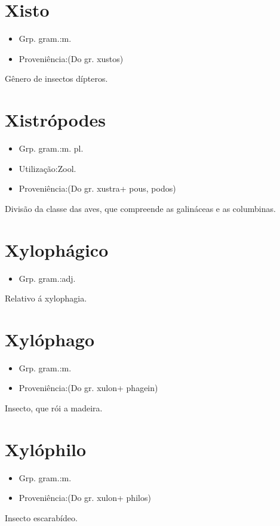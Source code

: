 \section{Xisto}
\begin{itemize}
\item {Grp. gram.:m.}
\end{itemize}
\begin{itemize}
\item {Proveniência:(Do gr. \textunderscore xustos\textunderscore )}
\end{itemize}
Gênero de insectos dípteros.
\section{Xistrópodes}
\begin{itemize}
\item {Grp. gram.:m. pl.}
\end{itemize}
\begin{itemize}
\item {Utilização:Zool.}
\end{itemize}
\begin{itemize}
\item {Proveniência:(Do gr. \textunderscore xustra\textunderscore  + \textunderscore pous\textunderscore , \textunderscore podos\textunderscore )}
\end{itemize}
Divisão da classe das aves, que compreende as galináceas e as columbinas.
\section{Xylophágico}
\begin{itemize}
\item {Grp. gram.:adj.}
\end{itemize}
Relativo á xylophagia.
\section{Xylóphago}
\begin{itemize}
\item {Grp. gram.:m.}
\end{itemize}
\begin{itemize}
\item {Proveniência:(Do gr. \textunderscore xulon\textunderscore  + \textunderscore phagein\textunderscore )}
\end{itemize}
Insecto, que rói a madeira.
\section{Xylóphilo}
\begin{itemize}
\item {Grp. gram.:m.}
\end{itemize}
\begin{itemize}
\item {Proveniência:(Do gr. \textunderscore xulon\textunderscore  + \textunderscore philos\textunderscore )}
\end{itemize}
Insecto escarabídeo.
